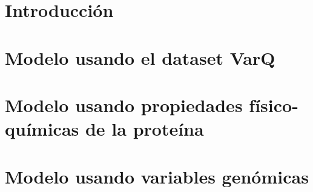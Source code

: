 \documentclass[11pt,a4paper,twoside]{tesis}
\begin{document}
\def\titulo{Licenciado}
\def\autor{Martín Ezequiel Langberg}
\def\tituloTesis{Predicción de patogenicidad en SNPs usando aprendizaje automático}
\def\runtitulo{Predicción de patogenicidad en polimorfismos de un sólo nucleótido usando aprendizaje automático}
\def\director{Ariel Berenstein}
\def\codirector{Pablo Turjanski}
\def\lugar{Buenos Aires, 2018}


\frontmatter
\pagestyle{empty}





\cleardoublepage
\tableofcontents

\mainmatter
\pagestyle{headings}


\chapter{Introducción}
\label{ch:introduccion}


% 

\chapter{Modelo usando el dataset VarQ}
\label{ch:desarrollo_varq}


\chapter{Modelo usando propiedades físico-químicas de la proteína}
\label{ch:desarrollo_fisico_quimico}


\chapter{Modelo usando variables genómicas}
\label{ch:desarrollo_genomico}

\end{document}
